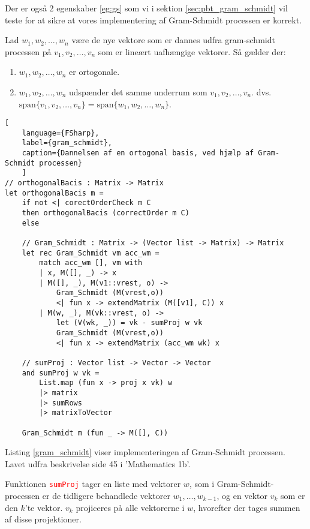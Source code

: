 Der er også 2 egenskaber \ref{eg:gs} som vi i sektion \ref{sec:pbt_gram_schmidt} vil teste for at sikre at vores implementering af Gram-Schmidt processen er korrekt.
\vspace{0.5cm}
\begin{egenskab}\label{eg:gs}
    Lad $w_1, w_2, \ldots, w_n$ være de nye vektore som er dannes udfra gram-schmidt processen på $v_1, v_2, \ldots, v_n$ som er lineært uafhængige vektorer. Så gælder der:
    \begin{enumerate}
        \item $w_1, w_2, \ldots, w_n$ er ortogonale.
        \item $w_1, w_2, \ldots, w_n$ udspænder det samme underrum som $v_1, v_2, \ldots, v_n$. dvs. \\$\text{span}\{v_1, v_2, \ldots, v_n\} = \text{span}\{w_1, w_2, \ldots, w_n\}$.
    \end{enumerate}
\end{egenskab}

\begin{lstlisting}[
    language={FSharp}, 
    label={gram_schmidt}, 
    caption={Dannelsen af en ortogonal basis, ved hjælp af Gram-Schmidt processen}
    ]
// orthogonalBacis : Matrix -> Matrix
let orthogonalBacis m =
    if not <| corectOrderCheck m C  
    then orthogonalBacis (correctOrder m C)
    else

    // Gram_Schmidt : Matrix -> (Vector list -> Matrix) -> Matrix
    let rec Gram_Schmidt vm acc_wm =
        match acc_wm [], vm with
        | x, M([], _) -> x 
        | M([], _), M(v1::vrest, o) -> 
            Gram_Schmidt (M(vrest,o)) 
            <| fun x -> extendMatrix (M([v1], C)) x 
        | M(w, _), M(vk::vrest, o) -> 
            let (V(wk, _)) = vk - sumProj w vk
            Gram_Schmidt (M(vrest,o)) 
            <| fun x -> extendMatrix (acc_wm wk) x

    // sumProj : Vector list -> Vector -> Vector
    and sumProj w vk =
        List.map (fun x -> proj x vk) w 
        |> matrix 
        |> sumRows
        |> matrixToVector
        
    Gram_Schmidt m (fun _ -> M([], C))
\end{lstlisting}

Listing \ref{gram_schmidt} viser implementeringen af Gram-Schmidt processen. Lavet udfra beskrivelse side 45 i 'Mathematics 1b'.

Funktionen \textcolor{red}{\texttt{sumProj}} tager en liste med vektorer \(w\), som i Gram-Schmidt-processen er de tidligere behandlede vektorer \(w_1, \ldots, w_{k-1}\), og en vektor \(v_k\) som er den \(k\)'te vektor. $v_k$ projiceres på alle vektorerne i \(w\), hvorefter der tages summen af disse projektioner.

